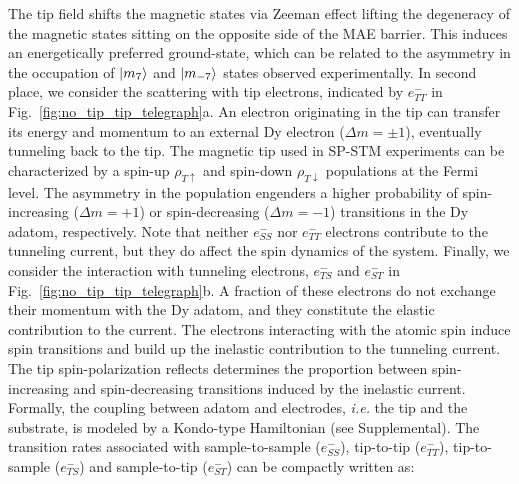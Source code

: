 \documentclass[
reprint,amsmath,amssymb,aps]{revtex4-2}
\begin{document}
The tip field shifts the magnetic states via Zeeman effect lifting the degeneracy of the magnetic states sitting on the opposite side of the MAE barrier. This induces an energetically preferred ground-state, which can be related to the asymmetry in the occupation of $\ket{m_7}$ and $\ket{m_{-7}}$ states observed experimentally.
In second place, we consider the scattering with tip electrons, indicated by $e^{-}_{TT}$ in Fig.~\ref{fig:no_tip_tip_telegraph}a. An electron originating in the tip can transfer its energy and momentum to an external Dy electron ($\Delta m=\pm 1$), eventually tunneling back to the tip. The magnetic tip used in SP-STM experiments can be characterized by a spin-up $\rho_{T\uparrow}$ and spin-down $\rho_{T\downarrow}$ populations at the Fermi level. The asymmetry in the population engenders a higher probability of spin-increasing ($\Delta m=+1$) or spin-decreasing ($\Delta m=-1$) transitions in the Dy adatom, respectively. Note that neither $e^{-}_{SS}$ nor $e^{-}_{TT}$ electrons contribute to the tunneling current, but they do affect the spin dynamics of the system. Finally, we consider the interaction with tunneling electrons, $e^{-}_{TS}$ and $e^{-}_{ST}$ in Fig.~\ref{fig:no_tip_tip_telegraph}b. A fraction of these electrons do not exchange their momentum with the Dy adatom, and they constitute the elastic contribution to the current. The electrons interacting with the atomic spin induce spin transitions and build up the inelastic contribution to the tunneling current. The tip spin-polarization reflects determines the proportion between spin-increasing and spin-decreasing transitions induced by the inelastic current. Formally, the coupling between adatom and electrodes, \textit{i.e.} the tip and the substrate, is modeled by a Kondo-type Hamiltonian \cite{delgado2010,delgadoSpinTransferTorqueSingle2010,fern2009} (see Supplemental). The transition rates associated with sample-to-sample ($e^{-}_{SS}$), tip-to-tip ($e^{-}_{TT}$), tip-to-sample ($e^{-}_{TS}$) and sample-to-tip ($e^{-}_{ST}$) can be compactly written as:
\end{document}
